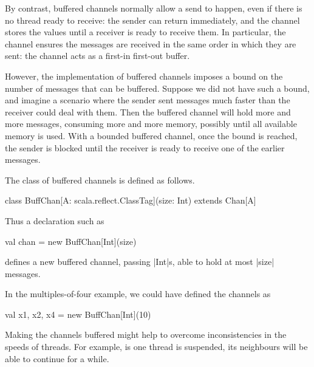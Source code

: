 By contrast, buffered channels normally allow a send to happen, even if there
is no thread ready to receive: the sender can return immediately, and the
channel stores the values until a receiver is ready to receive them.  In
particular, the channel ensures the messages are received in the same order in
which they are sent: the channel acts as a first-in first-out buffer.

However, the implementation of buffered channels imposes a bound on the number
of messages that can be buffered.  Suppose we did not have such a bound, and
imagine a scenario where the sender sent messages much faster than the
receiver could deal with them.  Then the buffered channel will hold more and
more messages, consuming more and more memory, possibly until all available
memory is used.  With a bounded buffered channel, once the bound is reached,
the sender is blocked until the receiver is ready to receive one of the
earlier messages. 


The class of buffered channels is defined as follows.
%
\begin{scala}
class BuffChan[A: scala.reflect.ClassTag](size: Int) extends Chan[A]
\end{scala}
%
Thus a declaration such as
\begin{scala}
val chan = new BuffChan[Int](size)
\end{scala}
defines a new buffered channel, passing |Int|s, able to hold at most |size|
messages.

In the multiples-of-four example, we could have defined the channels as 
%
\begin{scala}
  val x1, x2, x4 = new BuffChan[Int](10)
\end{scala}
%
Making the channels buffered might help to overcome inconsistencies in the
speeds of threads.  For example, is one thread is suspended, its neighbours
will be able to continue for a while.

